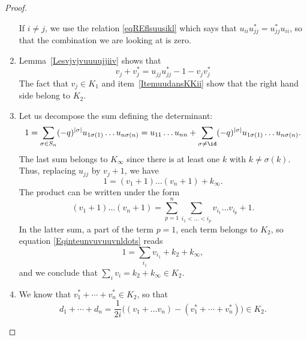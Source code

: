\begin{proof}
\begin{enumerate}
            If $i\neq j$, we use the relation \eqref{eqREflsuusikl} which says that $u_{ii}u_{jj}^*=u_{jj}^*u_{ii}$, so that the combination we are looking at is zero.
        \item
            Lemma~\ref{Lesvjvjvuuuujjiiv} shows that
            \begin{equation}        \label{Eqvvuiiujjvv}
                v_j+v_j^*=u_{jj}u_{jj}^*-1-v_jv_j^*
            \end{equation}
            The fact that $v_j\in K_1$ and item~\ref{ItemuudansKKii} show that the right hand side belong to $K_2$.
        \item
            Let us decompose the sum defining the determinant:
            \begin{equation}
                1=\sum_{\sigma\in S_n}(-q)^{| \sigma |}u_{1\sigma(1)}\ldots u_{n\sigma(n)}=u_{11}\ldots u_{nn}+\sum_{\sigma\neq \id}(-q)^{| \sigma |}u_{1\sigma(1)}\ldots u_{n\sigma(n)}.
            \end{equation}
            The last sum belongs to $K_{\infty}$ since there is at least one $k$ with $k\neq \sigma(k)$. Thus, replacing $u_{jj}$ by $v_j+1$,  we have
            \begin{equation}        \label{Eqinteunvuvuuvnldots}
                1=(v_1+1)\ldots (v_n+1)+k_{\infty}.
            \end{equation}
            The product can be written under the form
            \begin{equation}
                (v_1+1)\ldots(v_n+1)=\sum_{p=1}^n\sum_{i_1<\ldots<i_p}v_{i_1}\ldots v_{i_p}+1.
            \end{equation}
            In the latter sum, a part of the term $p=1$, each term belongs to $K_2$, so equation \eqref{Eqinteunvuvuuvnldots} reads
            \begin{equation}
                1=\sum_{i_1}v_{i_1}+k_2+k_{\infty},
            \end{equation}
            and we conclude that $\sum_iv_i=k_2+k_{\infty}\in K_2$.
        \item
            We know that $v_1^*+\cdots +v_n^*\in K_2$, so that
            \begin{equation}
                d_1+\cdots+ d_n=\frac{1}{ 2i }\big( (v_1+\ldots v_n)-(v_1^*+\cdots +v_n^*) \big)\in K_2.
            \end{equation}
    \end{enumerate}

\end{proof}

